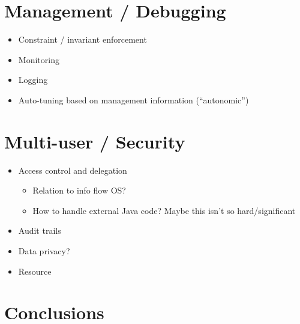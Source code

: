 \documentclass{sig-alternate}
\begin{document}
\section{Management / Debugging}
\begin{itemize}
\item
  Constraint / invariant enforcement
\item
  Monitoring
\item
  Logging
\item
  Auto-tuning based on management information (``autonomic'')
\end{itemize}

\section{Multi-user / Security}
\begin{itemize}
\item
  Access control and delegation
  \begin{itemize}
  \item
    Relation to info flow OS?
  \item
    How to handle external Java code? Maybe this isn't so hard/significant
  \end{itemize}
\item
  Audit trails
\item
  Data privacy?
\item
  Resource
\end{itemize}
\section{Conclusions}



\end{document}
